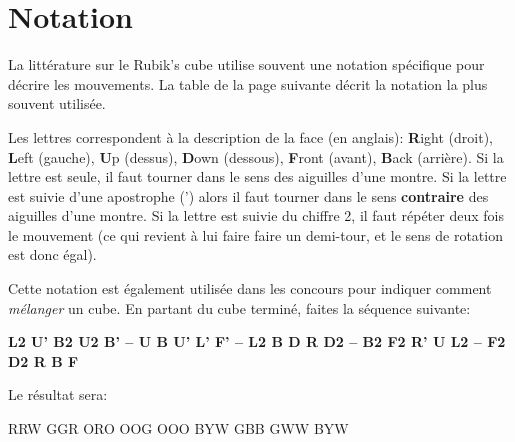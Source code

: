 \chapter{Notation}
La littérature sur le Rubik's cube utilise souvent une notation spécifique pour décrire les mouvements. La table de la page suivante décrit la notation la plus souvent utilisée.

Les lettres correspondent à la description de la face (en anglais): \textbf{R}ight (droit), \textbf{L}eft (gauche), \textbf{U}p (dessus), \textbf{D}own (dessous), \textbf{F}ront (avant), \textbf{B}ack (arrière).
Si la lettre est seule, il faut tourner dans le sens des aiguilles d'une montre.
Si la lettre est suivie d'une apostrophe (') alors il faut tourner dans le sens \textbf{contraire} des aiguilles d'une montre. Si la lettre est suivie du chiffre 2, il faut répéter deux fois le mouvement (ce qui revient à lui faire faire un demi-tour, et le sens de rotation est donc égal).

Cette notation est également utilisée dans les concours pour indiquer comment \emph{mélanger} un cube\cite{scramble}. En partant du cube terminé, faites la séquence suivante:

\textbf{L2 U' B2 U2 B' -- U B U' L' F' -- L2 B D R D2 -- B2 F2 R' U L2 -- F2 D2 R B F}

Le résultat sera:

\begin{center}
	\RubikFaceRight%
	{R}{R}{W}%
	{G}{G}{R}%
	{O}{R}{O}
	\RubikFaceFront%
	{O}{O}{G}%
	{O}{O}{O}%
	{B}{Y}{W}
	\RubikFaceUp%
	{G}{B}{B}%
	{G}{W}{W}%
	{B}{Y}{W}
\end{center} 

